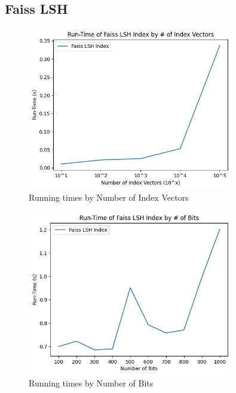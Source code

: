 \documentclass[12pt]{article}
\begin{document}
\subsection{Faiss LSH}

\begin{figure}[H]
    \centering
    \includegraphics[width=0.8\textwidth]{images/1_2_1.png}
    \caption{Running times by Number of Index Vectors}
\end{figure}

\begin{figure}[H]
    \centering
    \includegraphics[width=0.8\textwidth]{images/1_2_2.png}
    \caption{Running times by Number of Bits}
\end{figure}
\end{document}
